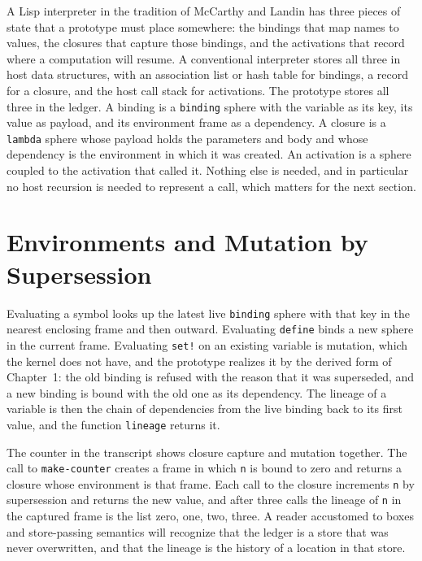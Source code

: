 A Lisp interpreter in the tradition of McCarthy and Landin \cite{mccarthy60,landin64,sicp} has three pieces of state that a prototype must place somewhere: the bindings that map names to values, the closures that capture those bindings, and the activations that record where a computation will resume. A conventional interpreter stores all three in host data structures, with an association list or hash table for bindings, a record for a closure, and the host call stack for activations. The \SP{} prototype stores all three in the ledger. A binding is a \texttt{binding} sphere with the variable as its key, its value as payload, and its environment frame as a dependency. A closure is a \texttt{lambda} sphere whose payload holds the parameters and body and whose dependency is the environment in which it was created. An activation is a sphere coupled to the activation that called it. Nothing else is needed, and in particular no host recursion is needed to represent a call, which matters for the next section.

\section{Environments and Mutation by Supersession}

Evaluating a symbol looks up the latest live \texttt{binding} sphere with that key in the nearest enclosing frame and then outward. Evaluating \texttt{define} binds a new sphere in the current frame. Evaluating \texttt{set!} on an existing variable is mutation, which the kernel does not have, and the prototype realizes it by the derived form of Chapter~1: the old binding is refused with the reason that it was superseded, and a new binding is bound with the old one as its dependency. The lineage of a variable is then the chain of dependencies from the live binding back to its first value, and the function \texttt{lineage} returns it.


The counter in the transcript shows closure capture and mutation together. The call to \texttt{make-counter} creates a frame in which \texttt{n} is bound to zero and returns a closure whose environment is that frame. Each call to the closure increments \texttt{n} by supersession and returns the new value, and after three calls the lineage of \texttt{n} in the captured frame is the list zero, one, two, three. A reader accustomed to boxes and store-passing semantics will recognize that the ledger is a store that was never overwritten, and that the lineage is the history of a location in that store.


